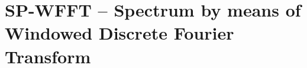 \documentclass[12pt,a4paper,oneside]{report} %
\begin{document}
\section*{\infosection} %

\section*{\examplesection} %


\chapter{SP-WFFT -- Spectrum by means of Windowed Discrete Fourier Transform} %
\section*{\infosection} %

\section*{\examplesection} %

\end{document}
